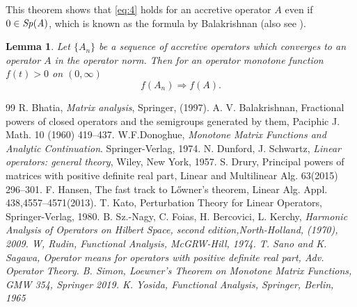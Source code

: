 \documentclass[10pt,a4paper]{amsart}
\newtheorem{lemma}[theorem]{Lemma}
\begin{document}
This theorem shows that \eqref{eq:4} holds for an accretive operator $A$ 
even if $0\in \it{Sp}(A)$, which is known as the formula by Balakrishnan\cite{Bal} (also see 
\cite{Kato-book, N-F}).\par 
\begin{lemma}\label{Le:2}
Let $\{A_n\}$ be a sequence of accretive operators which converges to an operator 
$A$ in the operator norm. Then for an operator monotone function 
$f(t) >0$ on $(0, \infty)$
$$f (A_n) \Longrightarrow f(A).$$
\end{lemma}

\begin{thebibliography}{99}
 R. Bhatia, {\it Matrix analysis}, Springer, (1997).
 A. V. Balakrishnan, Fractional powers of closed operators and the semigroups generated by them, Paciphic J. Math. 10 (1960) 419--437.
 W.\;F.\;Donoghue, {\it Monotone Matrix Functions and Analytic Continuation}. Springer-Verlag, 1974.
 N. Dunford, J. Schwartz, {\it Linear operators: general theory}, Wiley, New York, 1957.
 S. Drury, Principal powers of matrices with positive definite real part, Linear and Multilinear Alg. 63(2015) 296--301.
 F. Hansen, The fast track to L\H{o}wner's theorem, Linear Alg. Appl. 438,4557--4571(2013).
 T. Kato, Perturbation Theory for Linear Operators, Springer-Verlag, 1980. %
 B. Sz.-Nagy, C. Foias, H. Bercovici, L. Kerchy, \it Harmonic Analysis of Operators on Hilbert Space, second edition,\rm North-Holland, (1970), 2009.
 W, Rudin, \it Functional Analysis, \rm McGRW-Hill, 1974.
 T. Sano and K. Sagawa, Operator means for operators with positive definite real part, Adv. Operator Theory.
 B. Simon, Loewner's Theorem on Monotone Matrix Functions, GMW 354, Springer 2019.
 K. Yosida, \it Functional Analysis, \rm Springer, Berlin, 1965
\end{thebibliography}
\end{document}
